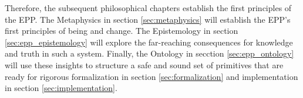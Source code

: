 Therefore, the subsequent philosophical chapters establish the first principles of the EPP. The Metaphysics in section \ref{sec:metaphysics} will establish the EPP's first principles of being and change. The Epistemology in section \ref{sec:epp_epistemology} will explore the far-reaching consequences for knowledge and truth in such a system. Finally, the Ontology in secction \ref{sec:epp_ontology} will use these insights to structure a safe and sound set of primitives that are ready for rigorous formalization in section \ref{sec:formalization} and implementation in section \ref{sec:implementation}. 

\newpage
